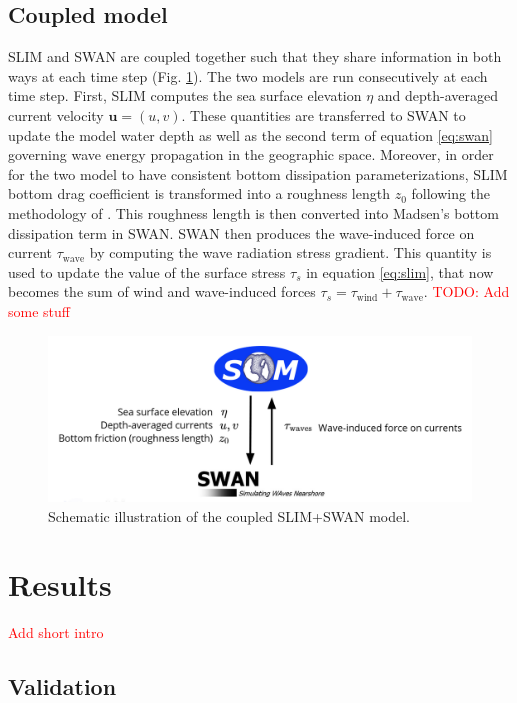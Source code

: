 \documentclass[11pt,a4paper]{article}
\begin{document}
\subsection{Coupled model}
SLIM and SWAN are coupled together such that they share information in both ways at each time step (Fig. \ref{fig:coupling}). The two models are run consecutively at each time step. First, SLIM computes the sea surface elevation $\eta$ and depth-averaged current velocity $\mathbf{u}=(u,v)$. These quantities are transferred to SWAN to update the model water depth as well as the second term of equation \ref{eq:swan} governing wave energy propagation in the geographic space. Moreover, in order for the two model to have consistent bottom dissipation parameterizations, SLIM bottom drag coefficient is transformed into a roughness length $z_0$ following the methodology of \cite{dietrich2011hurricane}. This roughness length is then converted into Madsen's bottom dissipation term in SWAN. SWAN then produces the wave-induced force on current {\boldmath$\tau$}$_\text{wave}$ by computing the wave radiation stress gradient. This quantity is used to update the value of the surface stress {\boldmath$\tau$}$_s$ in equation \ref{eq:slim}, that now becomes the sum of wind and wave-induced forces {\boldmath$\tau$}$_s=${\boldmath$\tau$}$_\text{wind}+${\boldmath$\tau$}$_\text{wave}$. \textcolor{red}{TODO: Add some stuff}
\begin{figure}
    \centering
    \includegraphics[width=.95\textwidth]{fig/coupling.png}
    \caption{Schematic illustration of the coupled SLIM+SWAN model.}
    \label{fig:coupling}
\end{figure}
 

\section{Results}

\textcolor{red}{Add short intro}

\subsection{Validation}
\end{document}
